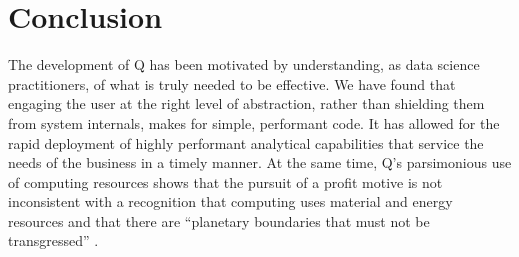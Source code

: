 \section{Conclusion}
\label{end}

The development of Q has been motivated by understanding, as data 
science practitioners, of what is truly needed to be
effective. We have found that engaging the user at the right level of abstraction, rather than shielding them from
system internals, makes for simple, performant code. It has allowed for the
rapid deployment of highly performant analytical capabilities that 
service the needs of the business in a timely manner. At the same time, Q's
parsimonious use of computing resources shows that the pursuit of a profit
motive is not inconsistent with a recognition that computing uses 
material and energy resources \cite{Limits2018} and that there are 
``planetary boundaries that must not be transgressed'' \cite{Rockstrom2009}.

